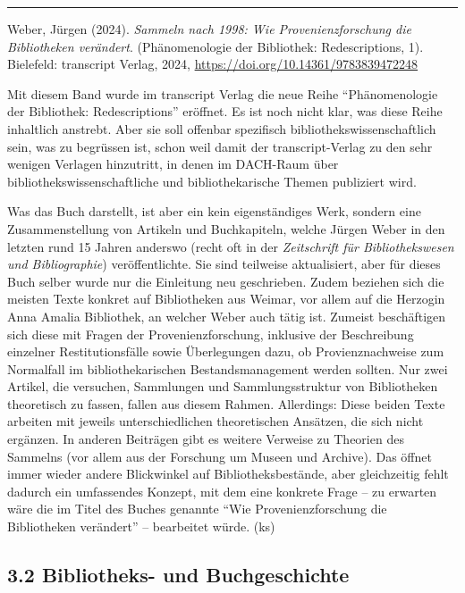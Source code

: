 \documentclass[a4paper,
fontsize=11pt,
oneside,
numbers=noperiodatend,
parskip=half-,
bibliography=totoc,
final
]{scrartcl}
\begin{document}
\begin{center}\rule{0.5\linewidth}{0.5pt}\end{center}

Weber, Jürgen (2024). \emph{Sammeln nach 1998: Wie Provenienzforschung
die Bibliotheken verändert}. (Phänomenologie der Bibliothek:
Redescriptions, 1). Bielefeld: transcript Verlag, 2024,
\url{https://doi.org/10.14361/9783839472248}

Mit diesem Band wurde im transcript Verlag die neue Reihe
\enquote{Phänomenologie der Bibliothek: Redescriptions} eröffnet. Es ist
noch nicht klar, was diese Reihe inhaltlich anstrebt. Aber sie soll
offenbar spezifisch bibliothekswissenschaftlich sein, was zu begrüssen
ist, schon weil damit der transcript-Verlag zu den sehr wenigen Verlagen
hinzutritt, in denen im DACH-Raum über bibliothekswissenschaftliche und
bibliothekarische Themen publiziert wird.

Was das Buch darstellt, ist aber ein kein eigenständiges Werk, sondern
eine Zusammenstellung von Artikeln und Buchkapiteln, welche Jürgen Weber
in den letzten rund 15 Jahren anderswo (recht oft in der
\emph{Zeitschrift für Bibliothekswesen und Bibliographie})
veröffentlichte. Sie sind teilweise aktualisiert, aber für dieses Buch
selber wurde nur die Einleitung neu geschrieben. Zudem beziehen sich die
meisten Texte konkret auf Bibliotheken aus Weimar, vor allem auf die
Herzogin Anna Amalia Bibliothek, an welcher Weber auch tätig ist.
Zumeist beschäftigen sich diese mit Fragen der Provenienzforschung,
inklusive der Beschreibung einzelner Restitutionsfälle sowie
Überlegungen dazu, ob Provienznachweise zum Normalfall im
bibliothekarischen Bestandsmanagement werden sollten. Nur zwei Artikel,
die versuchen, Sammlungen und Sammlungsstruktur von Bibliotheken
theoretisch zu fassen, fallen aus diesem Rahmen. Allerdings: Diese
beiden Texte arbeiten mit jeweils unterschiedlichen theoretischen
Ansätzen, die sich nicht ergänzen. In anderen Beiträgen gibt es weitere
Verweise zu Theorien des Sammelns (vor allem aus der Forschung um Museen
und Archive). Das öffnet immer wieder andere Blickwinkel auf
Bibliotheksbestände, aber gleichzeitig fehlt dadurch ein umfassendes
Konzept, mit dem eine konkrete Frage – zu erwarten wäre die im Titel des
Buches genannte \enquote{Wie Provenienzforschung die Bibliotheken
verändert} – bearbeitet würde. (ks)

\hypertarget{bibliotheks--und-buchgeschichte}{%
\subsection{3.2 Bibliotheks- und
Buchgeschichte}\label{bibliotheks--und-buchgeschichte}}
\end{document}
